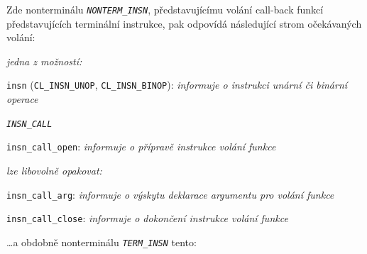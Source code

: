 \bigskip
\noindent
Zde nonterminálu \texttt{\textit{NONTERM\_INSN}}, představujícímu volání call-back funkcí
představujících terminální instrukce, pak odpovídá následující strom očekávaných
volání:

\smallskip
\begin{myitemize}[itemsep=0pt,partopsep=0pt,parsep=0pt,topsep=0pt,label=\textbullet]
  \item[\ndash] \textsl{jedna z možností:}
    \begin{myitemize}[itemsep=0pt,partopsep=0pt,parsep=0pt,topsep=0pt,label=\textbullet]
      \item \texttt{insn} (\texttt{CL\_INSN\_UNOP},
                           \texttt{CL\_INSN\_BINOP}): \textit{informuje o instrukci unární či binární operace}
      \item[\whitebullet] \texttt{\textit{INSN\_CALL}}
        \begin{myitemize}[itemsep=0pt,partopsep=0pt,parsep=0pt,topsep=0pt,label=\textbullet]
          \item \texttt{insn\_call\_open}: \textit{informuje o přípravě instrukce volání funkce}
          \item[\ndash] \textsl{lze libovolně opakovat:}
            \begin{myitemize}[itemsep=0pt,partopsep=0pt,parsep=0pt,topsep=0pt,label=\textbullet]
              \item \texttt{insn\_call\_arg}: \textit{informuje o výskytu deklarace argumentu pro volání funkce}
            \end{myitemize}
          \item \texttt{insn\_call\_close}: \textit{informuje o dokončení instrukce volání funkce}
        \end{myitemize}
    \end{myitemize}
\end{myitemize}

\bigskip
\noindent
\dots a obdobně nonterminálu \texttt{\textit{TERM\_INSN}} tento:

